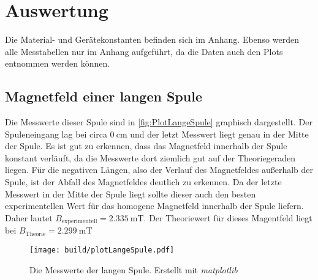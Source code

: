 \section{Auswertung}
\label{sec:Auswertung}
Die Material- und Gerätekonstanten befinden sich im Anhang. Ebenso werden alle Messtabellen nur im Anhang aufgeführt, da die Daten auch den Plots entnommen werden können.
\subsection{Magnetfeld einer langen Spule}
\label{subsec:A_langeSpule}
Die Messwerte dieser Spule sind in \autoref{fig:PlotLangeSpule} graphisch dargestellt. Der Spuleneingang lag bei circa $0\:\unit{\centi\metre}$ und der letzt Messwert liegt genau in der Mitte der Spule.
Es ist gut zu erkennen, dass das Magnetfeld innerhalb der Spule konstant verläuft, da die Messwerte dort ziemlich gut auf der Theoriegeraden liegen. Für die negativen Längen, also der Verlauf
des Magnetfeldes außerhalb der Spule, ist der Abfall des Magnetfeldes deutlich zu erkennen. Da der letzte Messwert in der Mitte der Spule liegt sollte dieser auch den besten experimentellen Wert
für das homogene Magnetfeld innerhalb der Spule liefern. Daher lautet $B_{\text{experimentell}} = 2.335\:\unit{\milli\tesla}$. Der Theoriewert für dieses Magentfeld liegt bei $B_{\text{Theorie}} = 2.299\:\unit{\milli\tesla}$
\begin{figure}
    \centering
    \caption{Die Messwerte der langen Spule. Erstellt mit \textit{matplotlib} \cite{matplotlib}}
    \label{fig:PlotLangeSpule}
    \texttt{[image: build/plotLangeSpule.pdf]}
\end{figure}
